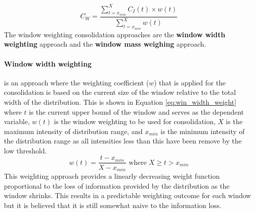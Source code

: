 \begin{equation}\label{eq:window_weighting}
    C_W = \frac{\sum_{t=x_{min}}^X C_I(t)\times w(t)}{\sum_{t=x_{min}}^X w(t)}
\end{equation}
The window weighting consolidation approaches are the \textbf{window width weighting} approach and the \textbf{window mass weighing} approach.
\paragraph{Window width weighting} is an approach where the weighting coefficient ($w$) that is applied for the consolidation is based on the current size of the window relative to the total width of the distribution. This is shown in Equation \ref{eq:win_width_weight} where $t$ is the current upper bound of the window and serves as the dependent variable, $w(t)$ is the window weighting to be used for consolidation, $X$ is the maximum intensity of distribution range, and $x_{min}$ is the minimum intensity of the distribution range as all intensities less than this have been remove by the low threshold.   
\begin{equation}\label{eq:win_width_weight}
    w(t) = \frac{t-x_{min}}{X-x_{min}}\text{ where } X \geq t > x_{min}
\end{equation}
This weighting approach provides a linearly decreasing weight function proportional to the loss of information provided by the distribution as the window shrinks. This results in a predictable weighting outcome for each window but it is believed that it is still somewhat naive to the information loss. 

